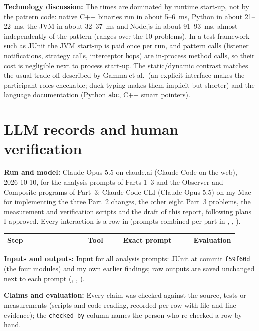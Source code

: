 \documentclass[11pt,a4paper]{article}
\newcommand{\entry}[1]{\textbf{#1:} }
\begin{document}
\entry{Technology discussion}The times are dominated by runtime start-up, not by the pattern code: native C++ binaries run in about 5--6~ms, Python in about 21--22~ms, the JVM in about 32--37~ms and Node.js in about 91--93~ms, almost independently of the pattern (ranges over the 10 problems). In a test framework such as JUnit the JVM start-up is paid once per run, and pattern calls (listener notifications, strategy calls, interceptor hops) are in-process method calls, so their cost is negligible next to process start-up. The static/dynamic contrast matches the usual trade-off described by Gamma et al.\ (an explicit interface makes the participant roles checkable; duck typing makes them implicit but shorter) and the language documentation (Python \texttt{abc}, C++ smart pointers).

\section{LLM records and human verification}
\entry{Run and model}Claude Opus 5.5 on claude.ai (Claude Code on the web), 2026-10-10, for the analysis prompts of Parts 1--3 and the Observer and Composite programs of Part~3; Claude Code CLI (Claude Opus 5.5) on my Mac for implementing the three Part~2 changes, the other eight Part~3 problems, the measurement and verification scripts and the draft of this report, following plans I approved. Every interaction is a row in  (prompts combined per part in , , ).

{\small\renewcommand{\UrlBreaks}{\do\/\do\_}%
\begin{longtable}{@{}>{\raggedright\arraybackslash}p{0.34\linewidth}>{\raggedright\arraybackslash}p{0.15\linewidth}>{\raggedright\arraybackslash}p{0.30\linewidth}>{\raggedright\arraybackslash}p{0.13\linewidth}@{}}\toprule
Step & Tool & Exact prompt & Evaluation\\\midrule\endhead
\bottomrule\end{longtable}}

\entry{Inputs and outputs}Input for all analysis prompts: JUnit at commit \texttt{f59f60d} (the four modules) and my own earlier findings; raw outputs are saved unchanged next to each prompt (, , ).

\entry{Claims and evaluation}Every claim was checked against the source, tests or measurements (scripts and code reading, recorded per row with file and line evidence); the \texttt{checked\_by} column names the person who re-checked a row by hand.
\end{document}

